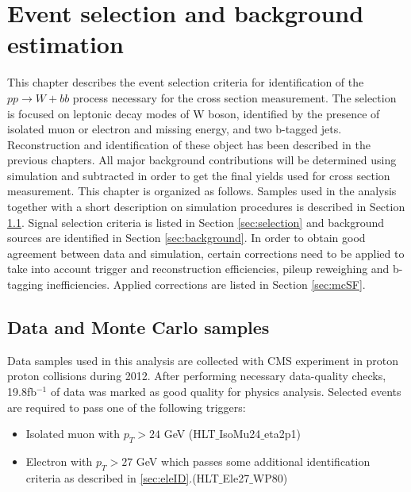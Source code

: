 
\chapter{Event selection and background estimation} %

\label{Chapter6} %


This chapter describes the event selection criteria for identification of the $pp\rightarrow W+bb$ process necessary for the cross section measurement. The selection is focused on leptonic decay modes of W boson, identified by the presence of isolated muon or electron and missing energy, and two b-tagged jets. Reconstruction and identification of these object has been described in the previous chapters. All major background contributions will be determined using simulation and subtracted in order to get the final yields used for cross section measurement. 
This chapter is organized as follows. Samples used in the analysis together with a short description on simulation procedures is described in Section \ref{sec:samples}. Signal selection criteria is listed in Section \ref{sec:selection} and background sources are identified in Section \ref{sec:background}. In order to obtain good agreement between data and simulation, certain corrections need to be applied to take into account trigger and reconstruction efficiencies, pileup reweighing and b-tagging inefficiencies. Applied corrections are listed in Section \ref{sec:mcSF}.     

\section{Data and Monte Carlo samples}
\label{sec:samples}
Data samples used in this analysis are collected with CMS experiment in proton proton collisions during 2012. After performing necessary data-quality checks, 19.8fb$^{-1}$ of data was marked as good quality for physics analysis. Selected events are required to pass one of the following triggers:
\begin{itemize}
\item Isolated muon with $p_T>24$ GeV (HLT$\_$IsoMu24$\_$eta2p1)
\item Electron with $p_T>27$ GeV which passes some additional identification criteria as described in \ref{sec:eleID}.(HLT$\_$Ele27$\_$WP80)
\end{itemize}

